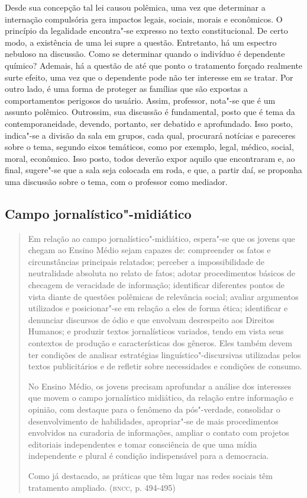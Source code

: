\documentclass[11pt]{extarticle}
\begin{document}
Desde sua concepção tal lei causou polêmica, uma vez que determinar a
internação compulsória gera impactos legais, sociais, morais e
econômicos. O princípio da legalidade encontra"-se expresso no texto
constitucional. De certo modo, a existência de uma lei supre a questão.
Entretanto, há um espectro nebuloso na discussão. Como se determinar
quando o indivíduo é dependente químico? Ademais, há a questão de até
que ponto o tratamento forçado realmente surte efeito, uma vez que o
dependente pode não ter interesse em se tratar. Por outro lado, é uma
forma de proteger as famílias que são expostas a comportamentos
perigosos do usuário. Assim, professor, nota"-se que é um assunto
polêmico. Outrossim, sua discussão é fundamental, posto que é tema da
contemporaneidade, devendo, portanto, ser debatido e aprofundado. Isso
posto, indica"-se a divisão da sala em grupos, cada qual, procurará
notícias e pareceres sobre o tema, segundo eixos temáticos, como por
exemplo, legal, médico, social, moral, econômico. Isso posto, todos
deverão expor aquilo que encontraram e, ao final, sugere"-se que a sala
seja colocada em roda, e que, a partir daí, se proponha uma discussão
sobre o tema, com o professor como mediador.

\subsection{Campo jornalístico"-midiático}

\begin{quote}
Em relação ao campo jornalístico"-midiático, espera"-se que os jovens
que chegam ao Ensino Médio sejam capazes de: compreender os fatos e
circunstâncias principais relatados; perceber a impossibilidade de
neutralidade absoluta no relato de fatos; adotar procedimentos básicos
de checagem de veracidade de informação; identificar diferentes pontos
de vista diante de questões polêmicas de relevância social; avaliar
argumentos utilizados e posicionar"-se em relação a eles de forma ética;
identificar e denunciar discursos de ódio e que envolvam desrespeito aos
Direitos Humanos; e produzir textos jornalísticos variados, tendo em
vista seus contextos de produção e características dos gêneros. Eles
também devem ter condições de analisar estratégias
linguístico"-discursivas utilizadas pelos textos publicitários e de
refletir sobre necessidades e condições de consumo.

No Ensino Médio, os jovens precisam aprofundar a análise dos interesses
que movem o campo jornalístico midiático, da relação entre informação e
opinião, com destaque para o fenômeno da pós"-verdade, consolidar o
desenvolvimento de habilidades, apropriar"-se de mais procedimentos
envolvidos na curadoria de informações, ampliar o contato com projetos
editoriais independentes e tomar consciência de que uma mídia
independente e plural é condição indispensável para a democracia.

Como já destacado, as práticas que têm lugar nas redes sociais têm
tratamento ampliado. (\textsc{bncc}, p. 494-495)
\end{quote}
\end{document}
